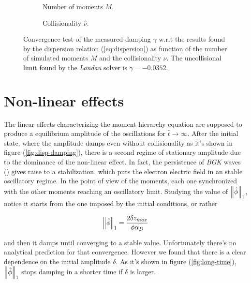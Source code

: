 \documentclass[final]{jpp}
\begin{document}
\begin{figure}
\begin{subfigure}{0.47\textwidth}
\resizebox{\textwidth}{!}{
    
}
\caption{Number of moments $M$.}
\end{subfigure}
\hspace{0.05\textwidth}
\begin{subfigure}{0.47\textwidth}
\resizebox{\textwidth}{!}{
    
}
\caption{Collisionality $\hat{\nu}$.}
\end{subfigure}
\caption{Convergence test of the measured damping $\gamma$ w.r.t the results found by the dispersion relation (\ref{eq:dispersion}) as function of the number of simulated moments $M$ and the collisionality $\hat{\nu}$. The uncollisional limit found by the \textit{Landau} solver is $\gamma = -0.0352$.}
\end{figure}

\section{Non-linear effects}

The linear effects characterizing the moment-hierarchy equation are supposed to produce a equilibrium amplitude of the oscillations for $\hat{t} \to \infty$. After the initial state, where the amplitude damps even without collisionality as it's shown in figure (\ref{fig:disp-damping}), there is a second regime of stationary amplitude due to the dominance of the non-linear effect. In fact, the persistence of \textit{BGK} waves (\cite{thesis5638}) gives raise to a stabilization, which puts the electron electric field in an stable oscillatory regime. In the point of view of the moments, each one synchronized with the other moments reaching an oscillatory limit.  
Studying the value of $\left\lVert\hat{\phi}\right\rVert_1$, notice it starts from the one imposed by the initial conditions, or rather

\begin{equation}
\left\lVert\hat{\phi}\right\rVert_1 = \frac{2\delta z_{max}}{\phi \alpha_D} 
\end{equation}

and then it damps until converging to a stable value. Unfortunately there's no analytical prediction for that convergence. However we found that there is a clear dependence on the initial amplitude $\delta$.
As it's shown in figure (\ref{fig:long-time}), $\left\lVert\hat{\phi}\right\rVert_1$ stops damping in a shorter time if $\delta$ is larger.
\end{document}
